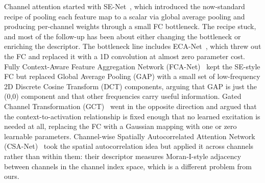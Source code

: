 \documentclass{bmvc2k}
\begin{document}
Channel attention started with SE-Net~\cite{hu2018squeeze}, which introduced the now-standard recipe of pooling each feature map to a
scalar via global average pooling and producing per-channel weights through a small FC bottleneck. The recipe stuck, and most of the follow-up has been about either changing the bottleneck or enriching the descriptor. The bottleneck line includes ECA-Net~\cite{wang2020eca}, which threw out the FC and replaced it with a 1D convolution at almost zero parameter cost. Fully Context-Aware Feature Aggregation Network (FCA-Net)~\cite{qin2021fcanet} kept the SE-style FC but replaced Global Average Pooling (GAP) with a small set of low-frequency 2D Discrete Cosine Transform (DCT) components, arguing that GAP is just the (0,0) component and that other frequencies carry useful information. Gated Channel Transformation (GCT)~\cite{ruan2021gct} went in the opposite direction and argued that the context-to-activation relationship is fixed enough that no learned excitation is needed at all, replacing the FC with a Gaussian mapping with one or zero learnable parameters. Channel-wise Spatially Autocorrelated Attention Network (CSA-Net)~\cite{si2022scsa} took the spatial autocorrelation idea but applied it across channels rather than within them: their descriptor measures Moran-I-style adjacency between channels in the channel index space, which is a different problem from ours.
 
\end{document}
